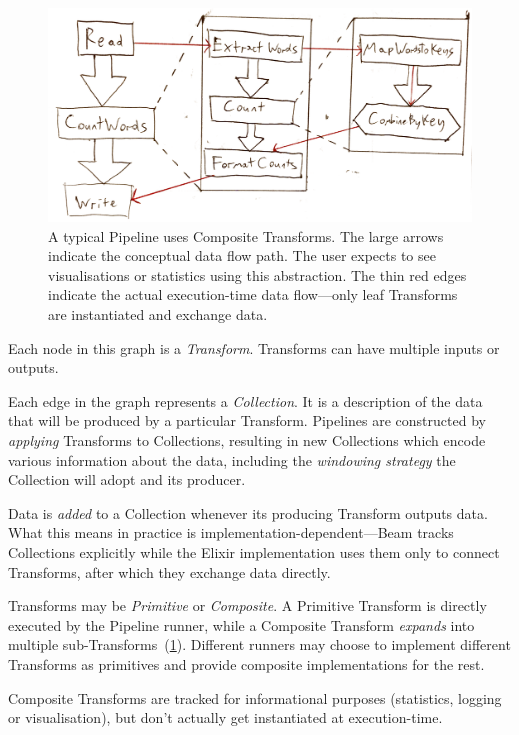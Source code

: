 \begin{figure}[t]
	\includegraphics[width=\textwidth]{images/temp/composite-example}
	\caption[An illustration of the function of Composite Transforms in a typical Pipeline.]{A typical Pipeline uses Composite Transforms. The large arrows indicate the conceptual data flow path. The user expects to see visualisations or statistics using this abstraction. The thin red edges indicate the actual execution-time data flow---only leaf Transforms are instantiated and exchange data.}
	\label{fig:impl:composite-transforms}
\end{figure}

Each node in this graph is a \emph{Transform}.
Transforms can have multiple inputs or outputs.

Each edge in the graph represents a \emph{Collection}.
It is a description of the data that will be produced by a particular Transform.
Pipelines are constructed by \emph{applying} Transforms to Collections, resulting in new Collections which encode various information about the data, including the \emph{windowing strategy} the Collection will adopt and its producer.

Data is \emph{added} to a Collection whenever its producing Transform outputs data.
What this means in practice is implementation-dependent---Beam tracks Collections explicitly while the Elixir implementation uses them only to connect Transforms, after which they exchange data directly.

Transforms may be \emph{Primitive} or \emph{Composite}.
A Primitive Transform is directly executed by the Pipeline runner, while a Composite Transform \emph{expands} into multiple sub-Transforms~(\cref{fig:impl:composite-transforms}).
Different runners may choose to implement different Transforms as primitives and provide composite implementations for the rest.

Composite Transforms are tracked for informational purposes (statistics, logging or visualisation), but don't actually get instantiated at execution-time.

